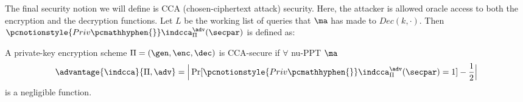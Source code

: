 The final security notion we will define is CCA (chosen-ciphertext attack) security.
Here, the attacker is allowed oracle access to both the encryption and the decryption functions.
Let $L$ be the working list of queries that $\ma$ has made to $Dec(k, \cdot)$.
Then $\pcnotionstyle{Priv\pcmathhyphen{}}\indcca_{\Pi}^{\adv}(\secpar)$ is defined as:

\begin{definition}
    A private-key encryption scheme $\Pi = (\gen,\enc,\dec)$ is CCA-secure if $\forall$ nu-PPT $\ma$
    $$\advantage{\indcca}{\Pi,\adv} = \Big| \Pr[\pcnotionstyle{Priv\pcmathhyphen{}}\indcca_\Pi^\adv(\secpar) =1] -\frac12\Big|$$
    is a negligible function.
\end{definition}

